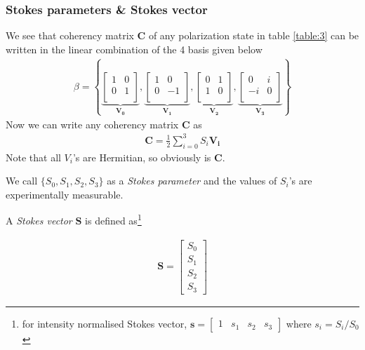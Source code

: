 \documentclass[11pt,a4paper]{article}
\numberwithin{equation}{section}
\begin{document}
\subsubsection{Stokes parameters \& Stokes vector}
We see that coherency matrix $\boldsymbol{C}$ of any polarization state in table \ref{table:3} can be written in the linear combination of the 4 basis given below \cite{simon 10}
\begin{align}
	\beta = \left\{
	\underbrace{\begin{bmatrix}1 & 0 \\ 0 & 1\\\end{bmatrix}}_{\boldsymbol{V_0}},
	\underbrace{\begin{bmatrix}1 & 0 \\ 0 & -1\\\end{bmatrix}}_{\boldsymbol{V_1}},
	\underbrace{\begin{bmatrix}0 & 1 \\ 1 & 0\\\end{bmatrix}}_{\boldsymbol{V_2}},
	\underbrace{\begin{bmatrix}0 & i \\ -i & 0\\\end{bmatrix}}_{\boldsymbol{V_3}}
	\right\}
\end{align}
Now we can write any coherency matrix $ \boldsymbol{C} $ as 
\begin{align}
\boldsymbol{C} = \frac{1}{2} \sum_{i=0}^{3} S_i \boldsymbol{V_i} \label{eq:1.12}
\end{align}
Note that all $V_i$'s are Hermitian, so obviously is $ \boldsymbol{C} $.

We call $\{S_0, S_1, S_2, S_3\}$ as a \textit{Stokes parameter} and the values of $S_i$'s are experimentally measurable.

A \textit{Stokes vector} $ \boldsymbol{S} $ is defined as\footnote{for intensity normalised Stokes vector, $\boldsymbol{s}= \begin{bmatrix} 1& s_1& s_2& s_3\end{bmatrix}$ where $s_i=S_i/S_0$}

\begin{align}
	\boldsymbol{S}= \begin{bmatrix} S_0\\ S_1\\ S_2\\S_3\end{bmatrix}
\end{align}
\end{document}
